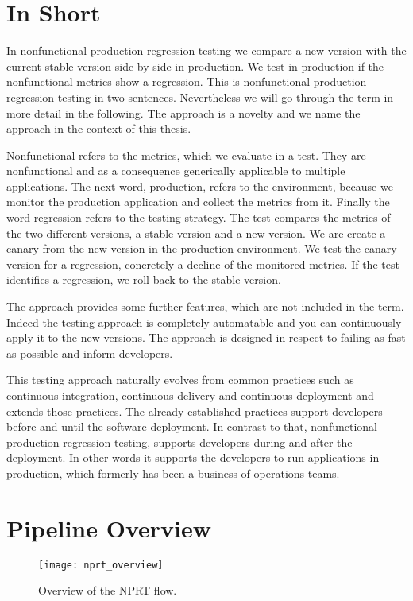 \section{In Short}

In nonfunctional production regression testing we compare a new version with the current
stable version side by side in production. We test in production if the nonfunctional
metrics show a regression. This is nonfunctional production regression testing in two
sentences.  Nevertheless we will go through the term in more detail in the following. The
approach is a novelty and we name the approach in the context of this thesis.

Nonfunctional refers to the metrics, which we evaluate in a test. They are nonfunctional
and as a consequence generically applicable to multiple applications. The next word,
production, refers to the environment, because we monitor the production application and
collect the metrics from it. Finally the word regression refers to the testing
strategy. The test compares the metrics of the two different versions, a stable version
and a new version. We are create a canary from the new version in the production
environment. We test the canary version for a regression, concretely a decline of the
monitored metrics. If the test identifies a regression, we roll back to the stable
version.

The approach provides some further features, which are not included in the term. Indeed
the testing approach is completely automatable and you can continuously apply it to the
new versions. The approach is designed in respect to failing as fast as possible and
inform developers.

This testing approach naturally evolves from common practices such as continuous
integration, continuous delivery and continuous deployment and extends those
practices. The already established practices support developers before and until the
software deployment. In contrast to that, nonfunctional production regression testing,
supports developers during and after the deployment. In other words it supports the
developers to run applications in production, which formerly has been a business of
operations teams.

\section{Pipeline Overview}

\begin{figure}[htbp]
  \texttt{[image: nprt\_overview]}
  \caption[nprtflow]{Overview of the NPRT flow.}
  \label{fig:nprt_flow}
\end{figure}

